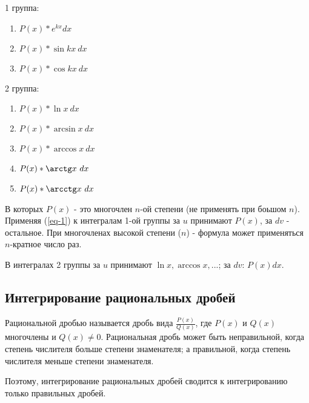 \documentclass[12pt,a4paper]{article}
\begin{document}
1 группа:
\begin{enumerate}[leftmargin=*, itemsep=0.4ex, before={\everymath{\displaystyle}}]%
\item{$P(x) * e^{kx} dx$}
\item{$P(x) * \sin kx\ dx$}
\item{$P(x) * \cos kx\ dx$}
\end{enumerate}

2 группа:
\begin{enumerate}[leftmargin=*, itemsep=0.4ex, before={\everymath{\displaystyle}}]%
\item{$P(x) * \ln x\ dx$}
\item{$P(x) * \arcsin x\ dx$}
\item{$P(x) * \arccos x\ dx$}
\item{$P(x) * \arctg x\ dx$}
\item{$P(x) * \arcctg x\ dx$}
\end{enumerate}

В которых $P(x)$ - это многочлен $n$-ой степени (не применять при
боьшом $n$).
Применяя (\ref{eq-1}) к интегралам 1-ой группы за $u$ принимают
$P(x)$, за $dv$ - остальное.
При многочленах высокой степени ($n$) - формула может
применяться $n$-кратное число раз.

В интегралах 2 группы за $u$ принимают $\ln x, \arccos x,...$;
за $dv$: $P(x) dx$.
\subsection{Интегрирование рациональных дробей}
Рациональной дробью называется дробь вида $\frac{P(x)}{Q(x)}$, где
$P(x)$ и $Q(x)$ многочлены и $Q(x) \neq 0$.
Рациональная дробь может быть неправильной, когда степень числителя
больше степени знаменателя; а правильной, когда степень
числителя меньше степени знаменателя.

Поэтому, интегрирование рациональных дробей сводится к
интегрированию только правильных дробей.
\end{document}
